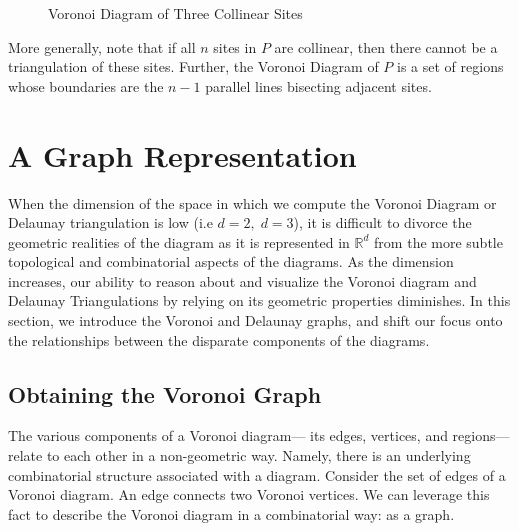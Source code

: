 \documentclass[12pt,twoside]{reedthesis}
\begin{document}
      \begin{figure}[!htb]
        \centering
        
        \caption{Voronoi Diagram of Three Collinear Sites}
        \label{fig:collinear}
      \end{figure}

      More generally, note that if all $n$ sites in $P$ are collinear, then there cannot be a triangulation of these sites. Further, the Voronoi Diagram of $P$ is a set of regions whose boundaries are the $n-1$ parallel lines bisecting adjacent sites. 




  \section{A Graph Representation} %
  \label{sub:a_graph_rep}

    When the dimension of the space in which we compute the Voronoi Diagram or Delaunay triangulation is low (i.e $d = 2,\; d=3 $), it is difficult to divorce the geometric realities of the diagram as it is represented in $\mathds{R}^d$ from the more subtle topological and combinatorial aspects of the diagrams. As the dimension increases, our ability to reason about and visualize the Voronoi diagram and Delaunay Triangulations by relying on its geometric properties diminishes. In this section, we introduce the Voronoi and Delaunay graphs, and shift our focus onto the relationships between the disparate components of the diagrams.\par

    \subsection{Obtaining the Voronoi Graph} %
    \label{sub:voronoi_graph}

      The various components of a Voronoi diagram--- its edges, vertices, and regions--- relate to each other in a non-geometric way. Namely, there is an underlying combinatorial structure associated with a diagram. Consider the set of edges of a Voronoi diagram. An edge connects two Voronoi vertices. We can leverage this fact to describe the Voronoi diagram in a combinatorial way: as a graph.\par
\end{document}
